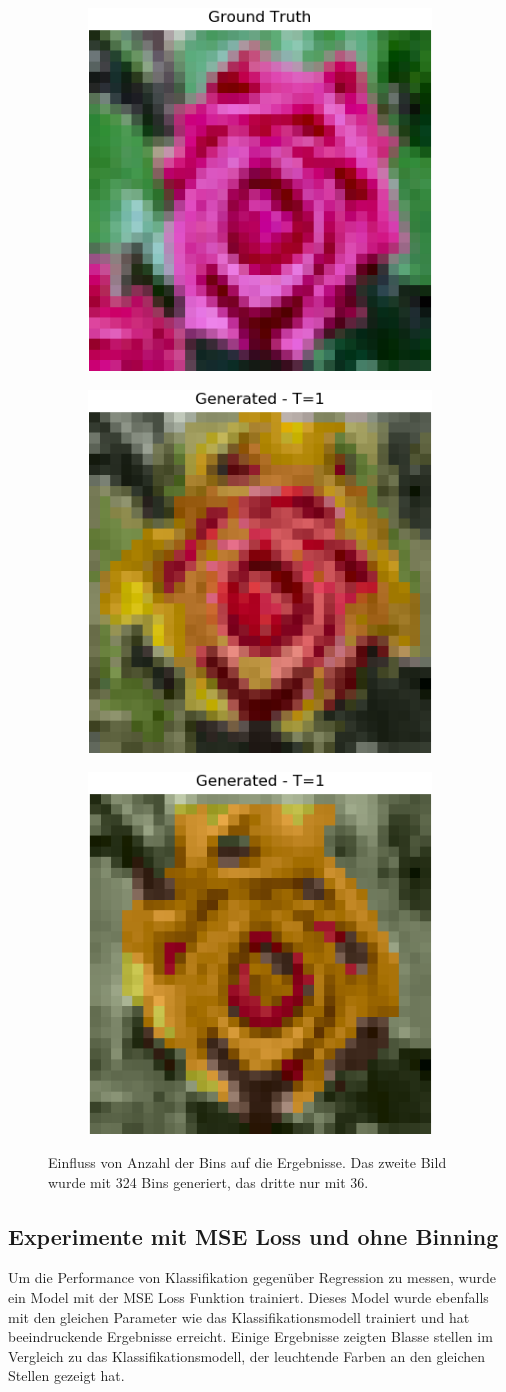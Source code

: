 \begin{figure}[H]
  \centering
  \vspace{1cm}
  \begin{subfigure}
    \centering
    \includegraphics[width=.24\textwidth]{resources/experiments/cifar/12_original.png}
  \end{subfigure}
  \begin{subfigure}
    \centering
    \includegraphics[width=.24\textwidth]{resources/experiments/cifar/12_t1.png}
  \end{subfigure}
  \begin{subfigure}
    \centering
    \includegraphics[width=.24\textwidth]{resources/experiments/cifar/12_t1_36.png}
  \end{subfigure}

  \caption{Einfluss von Anzahl der Bins auf die Ergebnisse. Das zweite Bild wurde mit 324 Bins generiert, das dritte nur mit 36.}
  \label{image:gute-ergebnisse-cifar}
\end{figure}

\subsection{Experimente mit MSE Loss und ohne Binning}
Um die Performance von Klassifikation gegenüber Regression zu messen, wurde ein Model mit der MSE Loss Funktion trainiert. Dieses Model
wurde ebenfalls mit den gleichen Parameter wie das Klassifikationsmodell trainiert und hat beeindruckende Ergebnisse erreicht. Einige Ergebnisse
zeigten Blasse stellen im Vergleich zu das Klassifikationsmodell, der leuchtende Farben an den gleichen Stellen gezeigt hat.

